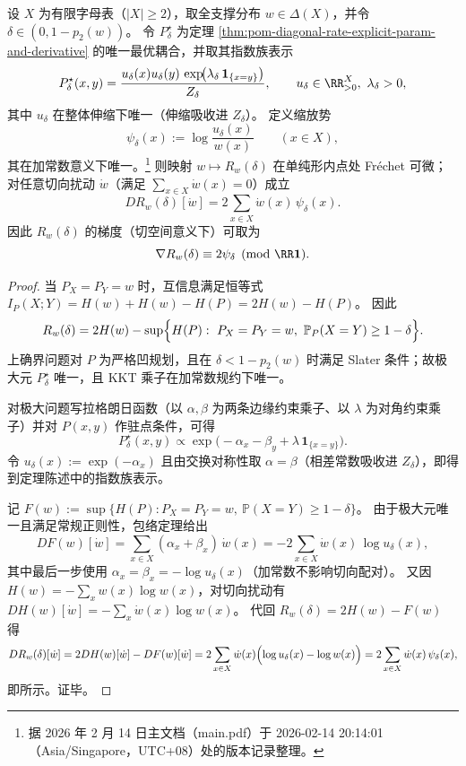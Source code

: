 \begin{theorem}\label{thm:pom-diagonal-rate-frechet-derivative-scaling-potential}
设 \(X\) 为有限字母表（\(|X|\ge 2\)），取全支撑分布 \(w\in\Delta(X)\)，并令 \(\delta\in(0,1-p_2(w))\)。
令 \(P^\star_\delta\) 为定理 \ref{thm:pom-diagonal-rate-explicit-param-and-derivative} 的唯一最优耦合，并取其指数族表示
\[
P^\star_\delta(x,y)=\frac{u_\delta(x)u_\delta(y)\,\exp\!\bigl(\lambda_\delta\,\mathbf 1_{\{x=y\}}\bigr)}{Z_\delta},
\qquad
u_\delta\in\RR_{>0}^{X},\ \lambda_\delta>0,
\]
其中 \(u_\delta\) 在整体伸缩下唯一（伸缩吸收进 \(Z_\delta\)）。
定义缩放势
\[
\psi_\delta(x):=\log\frac{u_\delta(x)}{w(x)}\qquad(x\in X),
\]
其在加常数意义下唯一。\footnote{据 2026 年 2 月 14 日主文档（main.pdf）于 2026-02-14 20:14:01（Asia/Singapore，UTC+08）处的版本记录整理。}
则映射 \(w\mapsto R_w(\delta)\) 在单纯形内点处 Fr\'echet 可微；对任意切向扰动 \(\dot w\)（满足 \(\sum_{x\in X}\dot w(x)=0\)）成立
\[
DR_w(\delta)[\dot w]=2\sum_{x\in X}\dot w(x)\,\psi_\delta(x).
\]
因此 \(R_w(\delta)\) 的梯度（切空间意义下）可取为
\[
\nabla R_w(\delta)\equiv 2\psi_\delta\pmod{\RR\mathbf 1}.
\]
\end{theorem}
\begin{proof}
当 \(P_X=P_Y=w\) 时，互信息满足恒等式
\(
I_P(X;Y)=H(w)+H(w)-H(P)
=2H(w)-H(P)
\)。
因此
\[
R_w(\delta)
=2H(w)-\sup\Bigl\{H(P):\ P_X=P_Y=w,\ \mathbb P_P(X=Y)\ge 1-\delta\Bigr\}.
\]
上确界问题对 \(P\) 为严格凹规划，且在 \(\delta<1-p_2(w)\) 时满足 Slater 条件；故极大元 \(P^\star_\delta\) 唯一，且 KKT 乘子在加常数规约下唯一。
\par
对极大问题写拉格朗日函数（以 \(\alpha,\beta\) 为两条边缘约束乘子、以 \(\lambda\) 为对角约束乘子）并对 \(P(x,y)\) 作驻点条件，可得
\[
P^\star_\delta(x,y)\propto \exp\!\bigl(-\alpha_x-\beta_y+\lambda\,\mathbf 1_{\{x=y\}}\bigr).
\]
令 \(u_\delta(x):=\exp(-\alpha_x)\) 且由交换对称性取 \(\alpha=\beta\)（相差常数吸收进 \(Z_\delta\)），即得到定理陈述中的指数族表示。
\par
记
\(
F(w):=\sup\{H(P):P_X=P_Y=w,\ \mathbb P(X=Y)\ge 1-\delta\}
\)。
由于极大元唯一且满足常规正则性，包络定理给出
\[
DF(w)[\dot w]=\sum_{x\in X}(\alpha_x+\beta_x)\,\dot w(x)
=-2\sum_{x\in X}\dot w(x)\,\log u_\delta(x),
\]
其中最后一步使用 \(\alpha_x=\beta_x=-\log u_\delta(x)\)（加常数不影响切向配对）。
又因 \(H(w)=-\sum_x w(x)\log w(x)\)，对切向扰动有 \(DH(w)[\dot w]=-\sum_x\dot w(x)\log w(x)\)。
代回 \(R_w(\delta)=2H(w)-F(w)\) 得
\[
DR_w(\delta)[\dot w]
=2DH(w)[\dot w]-DF(w)[\dot w]
=2\sum_{x\in X}\dot w(x)\Bigl(\log u_\delta(x)-\log w(x)\Bigr)
=2\sum_{x\in X}\dot w(x)\,\psi_\delta(x),
\]
即所示。证毕。
\end{proof}

